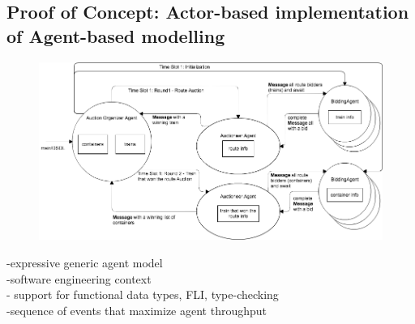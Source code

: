 \subsection{Proof of Concept: Actor-based implementation of Agent-based modelling}

\begin{figure}
	\centering
	\includegraphics[scale=0.4]{Model2}
	\caption{}\label{powseq}
\end{figure}
-expressive generic agent model \\
-software engineering context \\
- support for functional data types, FLI, type-checking\\
-sequence of events that maximize agent throughput\\
